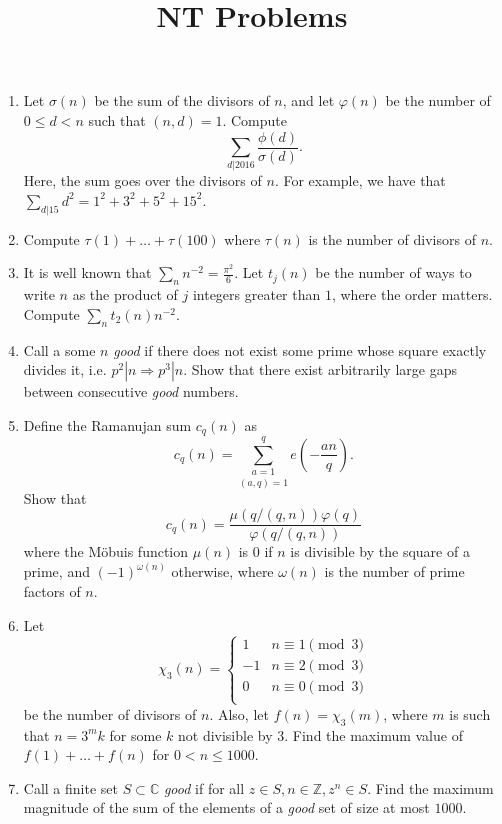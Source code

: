 \documentclass{article}
\begin{document}
\title{NT Problems}
\maketitle

\begin{enumerate}
\item Let $\sigma(n)$ be the sum of the divisors of $n$, and let $\varphi(n)$ be the number of $0\le d < n$ such that $(n, d) = 1$.
Compute $$\sum_{d|2016}\frac{\phi(d)}{\sigma(d)}.$$ 
Here, the sum goes over the divisors of $n$. For example, we have that $\sum_{d|15} d^2 = 1^2 + 3^2 + 5^2 + 15^2$.
\item Compute $\tau(1) + \dots + \tau(100)$ where $\tau(n)$ is the number of divisors of $n$.
\item It is well known that $\sum_{n} n^{-2} = \frac{\pi^2}{6}$. Let $t_j(n)$ be the number of ways to write $n$ as the product 
of $j$ integers greater than $1$, where the order matters. Compute $\sum_{n}t_2(n)n^{-2}.$
\item Call a some $n$ \textit{good} if there does not exist some prime whose square exactly divides it, i.e. 
$p^2 | n\Rightarrow p^3|n$. Show that there exist arbitrarily large gaps between consecutive \textit{good} numbers.
\item Define the Ramanujan sum $c_q(n)$ as $$c_q(n) = \underset{(a, q) = 1}{\sum_{a = 1}^q} e\left(-\frac{an}{q}\right).$$ 
Show that $$c_q(n) = \frac{\mu(q/(q, n))\varphi(q)}{\varphi(q/(q, n))}$$ where the M\"obuis function $\mu(n)$ is $0$ if 
$n$ is divisible by the square of a prime, and $(-1)^{\omega(n)}$ otherwise, where $\omega(n)$ is the number of prime factors of $n$.
\item Let 
\[
\chi_3(n) = \begin{cases}
1 & n\equiv 1\pmod{3} \\
-1 & n\equiv 2\pmod{3} \\
0 & n\equiv 0\pmod{3} \\
\end{cases}
\] 
be the number of divisors of $n$. Also, let $f(n) = \chi_3(m)$, where $m$ is such that $n = 3^{m}k$ for some $k$ not divisible by $3$.
Find the maximum value of $f(1) + \dots + f(n)$ for $0 < n\le 1000.$
\item Call a finite set $S \subset\mathbb{C}$ \textit{good} if for all $z\in S, n\in\mathbb{Z}, z^n\in S$. Find the maximum magnitude
of the sum of the elements of a \textit{good} set of size at most $1000$.
\end{enumerate}
\end{document}
